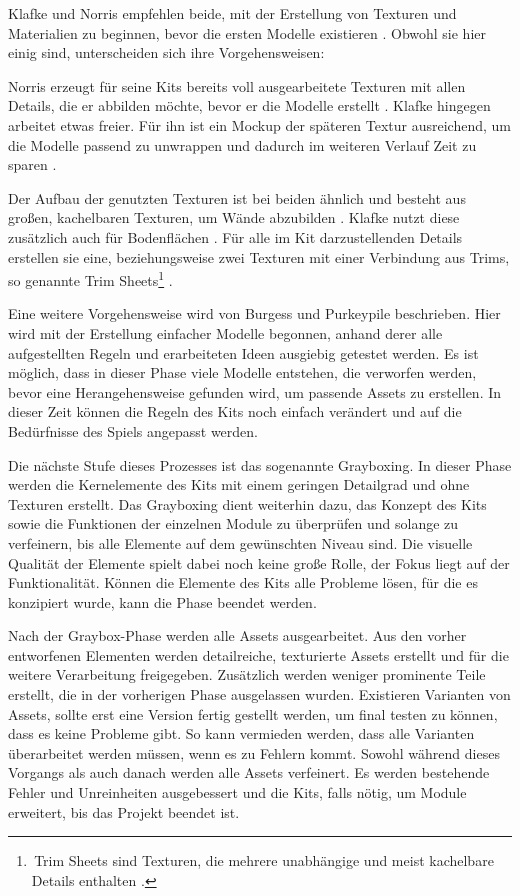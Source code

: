 \par
Klafke und Norris empfehlen beide, mit der Erstellung von Texturen und Materialien zu beginnen, bevor die ersten Modelle existieren \parencite{Klafke,Norris}. Obwohl sie hier einig sind, unterscheiden sich ihre Vorgehensweisen:
\par
Norris erzeugt für seine Kits bereits voll ausgearbeitete Texturen mit allen Details, die er abbilden möchte, bevor er die Modelle erstellt  \parencite{Norris}. Klafke hingegen arbeitet etwas freier. Für ihn ist ein Mockup der späteren Textur ausreichend, um die Modelle passend zu unwrappen und dadurch im weiteren Verlauf Zeit zu sparen \parencite{Klafke}.
\par
Der Aufbau der genutzten Texturen ist bei beiden ähnlich und besteht aus großen, kachelbaren Texturen, um Wände abzubilden \parencite{Klafke,Norris}. Klafke nutzt diese zusätzlich auch für Bodenflächen \parencite{Klafke}. Für alle im Kit darzustellenden Details erstellen sie eine, beziehungsweise zwei Texturen mit einer Verbindung aus Trims, so genannte Trim Sheets\footnote{\,Trim Sheets sind Texturen, die mehrere unabhängige und meist kachelbare Details enthalten \parencite{Meler}.} \parencite{Klafke,Norris}.
\par
Eine weitere Vorgehensweise wird von Burgess und Purkeypile beschrieben. Hier wird mit der Erstellung einfacher Modelle begonnen, anhand derer alle aufgestellten Regeln und erarbeiteten Ideen ausgiebig getestet werden. Es ist möglich, dass in dieser Phase viele Modelle entstehen, die verworfen werden, bevor eine Herangehensweise gefunden wird, um passende Assets zu erstellen. In dieser Zeit können die Regeln des Kits noch einfach verändert  und auf die Bedürfnisse des Spiels angepasst werden. \parencite{Burgess}
\par
Die nächste Stufe dieses Prozesses ist das sogenannte Grayboxing. In dieser Phase werden die Kernelemente des Kits mit einem geringen Detailgrad und ohne Texturen erstellt. Das Grayboxing dient weiterhin dazu, das Konzept des Kits sowie die Funktionen der einzelnen Module zu überprüfen und solange zu verfeinern, bis alle Elemente auf dem gewünschten Niveau sind. Die visuelle Qualität der Elemente spielt dabei noch keine große Rolle, der Fokus liegt auf der Funktionalität. Können die Elemente des Kits alle Probleme lösen, für die es konzipiert wurde, kann die Phase beendet werden. \parencite{Burgess}
\par
Nach der Graybox-Phase werden alle Assets ausgearbeitet. Aus den vorher entworfenen Elementen werden detailreiche, texturierte Assets erstellt und für die weitere Verarbeitung freigegeben. Zusätzlich werden weniger prominente Teile erstellt, die in der vorherigen Phase ausgelassen wurden. Existieren Varianten von Assets, sollte erst eine Version fertig gestellt werden, um final testen zu können, dass es keine Probleme gibt. So kann vermieden werden, dass alle Varianten überarbeitet werden müssen, wenn es zu Fehlern kommt. Sowohl während dieses Vorgangs als auch danach werden alle Assets verfeinert. Es werden bestehende Fehler und Unreinheiten ausgebessert und die Kits, falls nötig, um Module erweitert, bis das Projekt beendet ist. \parencite{Burgess}
